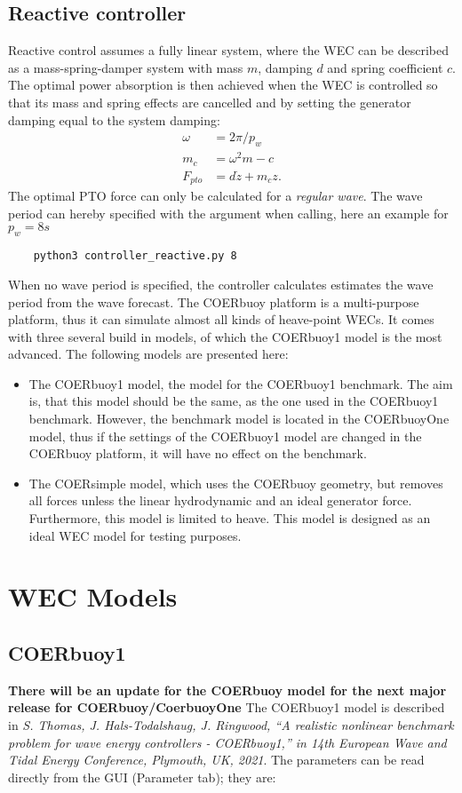 \documentclass[oneside,10pt,a4paper]{book}
\begin{document}
\subsection{Reactive controller}
Reactive control assumes a fully linear system, where the WEC can be described as a mass-spring-damper system with mass $m$, damping $d$ and spring coefficient $c$. The optimal power absorption is then achieved when the WEC is controlled so that its mass and spring effects are cancelled and by setting the generator damping equal to the system damping:
\begin{align*}
	\omega&=2\pi/p_w\\
	m_c&=\omega^2 m-c\\
	F_{pto}&=d\dot{z}+m_c z\text{.}
\end{align*}
The optimal PTO force can only be calculated for a \textit{regular wave}. The wave period can hereby specified with the argument when calling, here an example for $p_w=8 s$
\begin{verbatim}
	python3 controller_reactive.py 8
\end{verbatim}
When no wave period is specified, the controller calculates estimates the wave period from the wave forecast.
The COERbuoy platform is a multi-purpose platform, thus it can simulate almost all kinds of heave-point WECs. It comes with three several build in models, of which the COERbuoy1 model is the most advanced.
The following models are presented here:
\begin{itemize}
	\item The COERbuoy1 model, the model for the COERbuoy1 benchmark. The aim is, that this model should be the same, as the one used in the COERbuoy1 benchmark. However, the benchmark model is located in the COERbuoyOne model, thus if the settings of the COERbuoy1 model are changed in the COERbuoy platform, it will have no effect on the benchmark.
	\item The COERsimple model, which uses the COERbuoy geometry, but removes all forces unless the linear hydrodynamic and an ideal generator force. Furthermore, this model is limited to heave. This model is designed as an ideal WEC model for testing purposes. 
\end{itemize}
\section{WEC Models}
\subsection{COERbuoy1}
\textbf{There will be an update for the COERbuoy model for the next major release for COERbuoy/CoerbuoyOne}
The COERbuoy1 model is described in \textit{S. Thomas, J. Hals-Todalshaug, J. Ringwood, ``A realistic nonlinear benchmark problem for
wave energy controllers - COERbuoy1,'' in 14th European Wave and Tidal Energy Conference,
Plymouth, UK, 2021}. The parameters can be read directly from the GUI (Parameter tab); they are:
\end{document}
